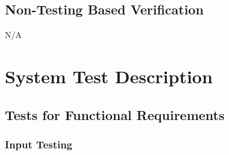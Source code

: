 \documentclass[12pt, titlepage]{article}
\begin{document}
\subsection{Non-Testing Based Verification}
N/A

\section{System Test Description}
\subsection{Tests for Functional Requirements}

\subsubsection{Input Testing}
\end{document}
